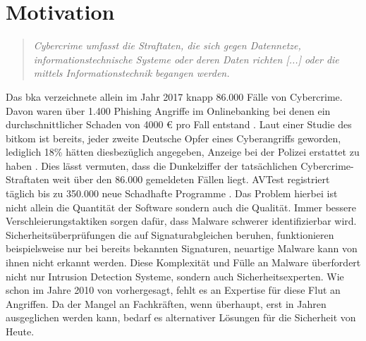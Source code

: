 \documentclass[
    12pt, %
    DIV10,
    ngerman, %
    a4paper, %
    oneside, %
    titlepage, %
    parskip=half, %
    headings=normal, %
    listof=totoc, %
    bibliography=totoc, %
    index=totoc, %
    captions=tableheading, %
    final %
]{scrreprt}
\begin{document}
\section{Motivation}
\begin{quote}
\textsl{Cybercrime umfasst die Straftaten, die sich gegen Datennetze, informationstechnische Systeme
oder deren Daten richten [...] oder die mittels Informationstechnik
begangen werden. \parencite{Cybercrime2017}}
\end{quote}
Das \ac{bka} verzeichnete allein im Jahr 2017 knapp 86.000 Fälle von Cybercrime. Davon waren über 1.400 Phishing Angriffe im Onlinebanking bei denen ein durchschnittlicher Schaden von 4000 € pro Fall entstand \parencite{Cybercrime2017}. Laut einer Studie des \ac{bitkom} ist bereits, jeder zweite Deutsche Opfer eines Cyberangriffs geworden, lediglich 18\% hätten diesbezüglich angegeben, Anzeige bei der Polizei erstattet zu haben \parencite{Bitkome.V.2017}. Dies lässt vermuten, dass die Dunkelziffer der tatsächlichen Cybercrime-Straftaten weit über den 86.000 gemeldeten Fällen liegt. AVTest registriert täglich bis zu 350.000 neue Schadhafte Programme \parencite{AV-TEST2019}. Das Problem hierbei ist nicht allein die Quantität der Software sondern auch die Qualität. Immer bessere Verschleierungstaktiken sorgen dafür, dass Malware schwerer identifizierbar wird. Sicherheitsüberprüfungen die auf Signaturabgleichen beruhen, funktionieren beispielsweise nur bei bereits bekannten Signaturen, neuartige Malware kann von ihnen nicht erkannt werden. Diese Komplexität und Fülle an Malware überfordert nicht nur Intrusion Detection Systeme, sondern auch Sicherheitsexperten. Wie schon im Jahre 2010 von \citeauthor{Evans2010} vorhergesagt, fehlt es an Expertise für diese Flut an Angriffen. Da der Mangel an Fachkräften, wenn überhaupt, erst in Jahren ausgeglichen werden kann, bedarf es alternativer Lösungen für die Sicherheit von Heute.
\\\\ 
\end{document}
